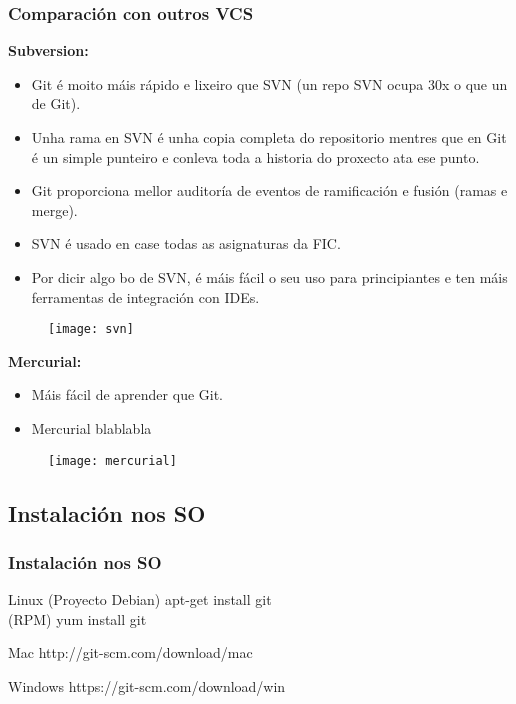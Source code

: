 \begin{frame}
  \frametitle{Comparación con outros VCS}
  \tiny
  \begin{multicols}{2}
    \textbf{Subversion:}
    \begin{itemize}
    \item Git é moito máis rápido e lixeiro que SVN (un repo SVN ocupa 30x o que un de Git).
    \item Unha rama en SVN é unha copia completa do repositorio mentres que en Git é un simple punteiro e conleva toda a historia do proxecto ata ese punto.
    \item Git proporciona mellor auditoría de eventos de ramificación e fusión (ramas e merge).
    \item SVN é usado en case todas as asignaturas da FIC.
    \item Por dicir algo bo de SVN, é máis fácil o seu uso para principiantes e ten máis ferramentas de integración con IDEs.
    \end{itemize}
    \begin{figure}
      \centering
      \texttt{[image: svn]}
      \label{fig:svn}
    \end{figure}

    \columnbreak

    \textbf{Mercurial:}
    \begin{itemize}
    \item Máis fácil de aprender que Git.
    \item Mercurial blablabla
    \end{itemize}
    \begin{figure}
      \centering
      \texttt{[image: mercurial]}
      \label{fig:mercurial}
    \end{figure}
  \end{multicols}
\end{frame}

\subsection{Instalación nos SO}
\begin{frame}
  \frametitle{Instalación nos SO}
  \begin{exampleblock}{Linux}
    (Proyecto Debian) apt-get install git\\
    (RPM) yum install git
  \end{exampleblock}
  \begin{block}{Mac}
    http://git-scm.com/download/mac
  \end{block}
  \begin{alertblock}{Windows}
    https://git-scm.com/download/win
  \end{alertblock}	
\end{frame}

